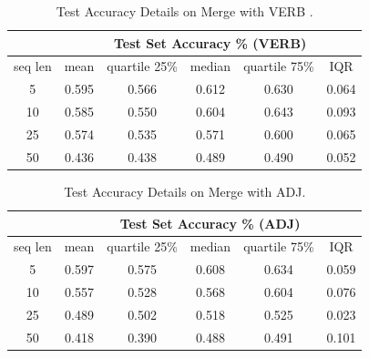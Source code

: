 \documentclass[12pt]{article}
\begin{document}
\begin{table}[!h]
\begin{tabular}{c|ccccc|}
\cline{2-6}
\multicolumn{1}{l|}{}         & \multicolumn{5}{c|}{Test Set Accuracy \% (VERB)}                                                                                           \\ \hline
\multicolumn{1}{|c|}{seq len} & \multicolumn{1}{c|}{mean}  & \multicolumn{1}{c|}{quartile 25\%} & \multicolumn{1}{c|}{median} & \multicolumn{1}{c|}{quartile 75\%} & IQR   \\ \hline
\multicolumn{1}{|c|}{5}       & \multicolumn{1}{c|}{0.595} & \multicolumn{1}{c|}{0.566}         & \multicolumn{1}{c|}{0.612}  & \multicolumn{1}{c|}{0.630}         & 0.064 \\ \hline
\multicolumn{1}{|c|}{10}      & \multicolumn{1}{c|}{0.585} & \multicolumn{1}{c|}{0.550}         & \multicolumn{1}{c|}{0.604}  & \multicolumn{1}{c|}{0.643}         & 0.093 \\ \hline
\multicolumn{1}{|c|}{25}      & \multicolumn{1}{c|}{0.574} & \multicolumn{1}{c|}{0.535}         & \multicolumn{1}{c|}{0.571}  & \multicolumn{1}{c|}{0.600}         & 0.065 \\ \hline
\multicolumn{1}{|c|}{50}      & \multicolumn{1}{c|}{0.436} & \multicolumn{1}{c|}{0.438}         & \multicolumn{1}{c|}{0.489}  & \multicolumn{1}{c|}{0.490}         & 0.052 \\ \hline
\end{tabular}
\caption{Test Accuracy Details on Merge with VERB .}
\label{appendix:verbMerge}
\end{table}

\begin{table}[!h]
\begin{tabular}{c|ccccc|}
\cline{2-6}
\multicolumn{1}{l|}{}         & \multicolumn{5}{c|}{Test Set Accuracy \% (ADJ)}                                                                                            \\ \hline
\multicolumn{1}{|c|}{seq len} & \multicolumn{1}{c|}{mean}  & \multicolumn{1}{c|}{quartile 25\%} & \multicolumn{1}{c|}{median} & \multicolumn{1}{c|}{quartile 75\%} & IQR   \\ \hline
\multicolumn{1}{|c|}{5}       & \multicolumn{1}{c|}{0.597} & \multicolumn{1}{c|}{0.575}         & \multicolumn{1}{c|}{0.608}  & \multicolumn{1}{c|}{0.634}         & 0.059 \\ \hline
\multicolumn{1}{|c|}{10}      & \multicolumn{1}{c|}{0.557} & \multicolumn{1}{c|}{0.528}         & \multicolumn{1}{c|}{0.568}  & \multicolumn{1}{c|}{0.604}         & 0.076 \\ \hline
\multicolumn{1}{|c|}{25}      & \multicolumn{1}{c|}{0.489} & \multicolumn{1}{c|}{0.502}         & \multicolumn{1}{c|}{0.518}  & \multicolumn{1}{c|}{0.525}         & 0.023 \\ \hline
\multicolumn{1}{|c|}{50}      & \multicolumn{1}{c|}{0.418} & \multicolumn{1}{c|}{0.390}         & \multicolumn{1}{c|}{0.488}  & \multicolumn{1}{c|}{0.491}         & 0.101 \\ \hline
\end{tabular}
\caption{Test Accuracy Details on Merge with ADJ.}
\label{appendix:adjMerge}
\end{table}
\end{document}
